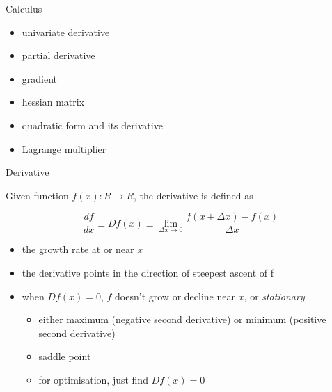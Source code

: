\documentclass[ignorenonframetext,]{beamer}
\providecommand{\tightlist}{%
  \setlength{\itemsep}{0pt}\setlength{\parskip}{0pt}}
\begin{document}
\begin{frame}{Calculus}
\protect\hypertarget{calculus}{}

\begin{itemize}
\item
  univariate derivative \bigskip
\item
  partial derivative \bigskip
\item
  gradient
\end{itemize}

\bigskip

\begin{itemize}
\tightlist
\item
  hessian matrix
\end{itemize}

\bigskip

\begin{itemize}
\tightlist
\item
  quadratic form and its derivative
\end{itemize}

\bigskip

\begin{itemize}
\tightlist
\item
  Lagrange multiplier
\end{itemize}

\end{frame}

\begin{frame}{Derivative}
\protect\hypertarget{derivative}{}

Given function \(f(x): R\rightarrow R\), the derivative is defined as

\[\frac{df}{dx} \equiv Df(x) \equiv \lim_{\Delta x \rightarrow 0} \frac{f(x+\Delta x) - f(x)}{\Delta x} \]

\begin{itemize}
\tightlist
\item
  the growth rate at or near \(x\)
\item
  the derivative points in the direction of steepest ascent of f
\item
  when \(Df(x) =0\), \(f\) doesn't grow or decline near \(x\), or
  \emph{stationary}

  \begin{itemize}
  \tightlist
  \item
    either maximum (negative second derivative) or minimum (positive
    second derivative)
  \item
    saddle point
  \item
    for optimisation, just find \(Df(x) = 0\)
  \end{itemize}
\end{itemize}

\end{frame}
\end{document}
